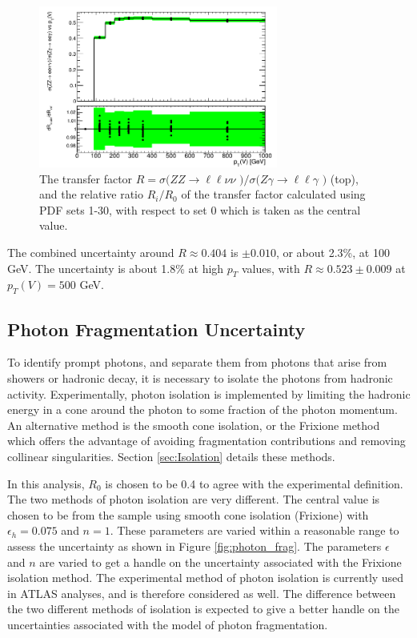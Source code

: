 \documentclass[12pt,a4paper,openright,twoside]{report}
\newcommand{\ZZ}{$ZZ\to \ell\ell\nu\nu$ }
\newcommand{\Zg}{$Z\gamma\to \ell\ell\gamma$ }
\begin{document}
\begin{figure}[H]
\centering
	\includegraphics[width = 0.7\textwidth]{R_pdf.png}
	\caption{The transfer factor $R = \sigma($\ZZ$)/\sigma($\Zg$)$ (top), and the relative ratio $R_i/R_0$ of the transfer factor  calculated using PDF sets 1-30, with respect to set 0 which is taken as the central value. }
	\label{fig:PDF30var}
\end{figure}
The combined uncertainty around $R \approx 0.404$ is $\pm 0.010$, or about 2.3\%, at 100 GeV. The uncertainty is about 1.8\% at high $p_T$ values, with $R \approx 0.523 \pm 0.009$ at $p_T(V)=500$ GeV.

\subsection{Photon Fragmentation Uncertainty}\label{subsec:photon_fragmentation}

To identify prompt photons, and separate them from photons that arise from showers or hadronic decay, it is necessary to isolate the photons from hadronic activity. Experimentally, photon isolation is implemented by limiting the hadronic energy in a cone around the photon to some fraction of the photon momentum. An alternative method is the smooth cone isolation, or the Frixione method which offers the advantage of avoiding fragmentation contributions and removing collinear singularities. Section \ref{sec:Isolation} details these methods.

In this analysis, $R_0$ is chosen to be 0.4 to agree with the experimental definition. The two methods of photon isolation are very different. The central value is chosen to be from the sample using smooth cone isolation (Frixione) with $\epsilon_h = 0.075$ and $n=1$. These parameters are varied within a reasonable range to assess the uncertainty as shown in Figure \ref{fig:photon_frag}. The parameters $\epsilon$ and $n$ are varied to get a handle on the uncertainty associated with the Frixione isolation method. The experimental method of photon isolation is currently used in ATLAS analyses, and is therefore considered as well. The difference between the two different methods of isolation is expected to give a better handle on the uncertainties associated with the model of photon fragmentation.
\end{document}
